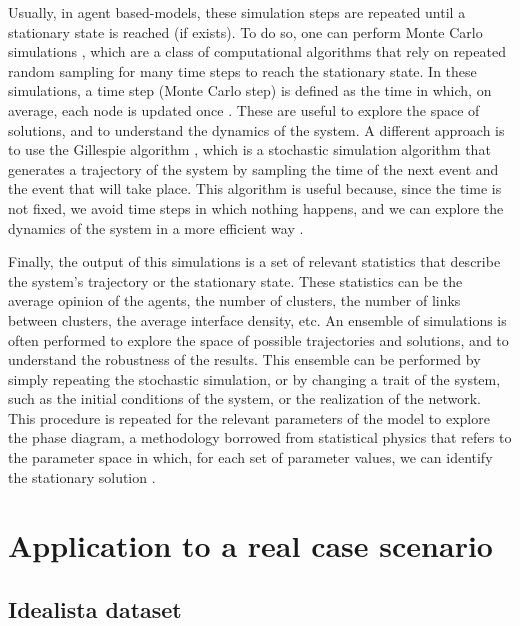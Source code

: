 Usually, in agent based-models, these simulation steps are repeated until a stationary state is reached (if exists). To do so, one can perform Monte Carlo simulations \cite{metropolis-1949}, which are a class of computational algorithms that rely on repeated random sampling for many time steps to reach the stationary state. In these simulations, a time step (Monte Carlo step) is defined as the time in which, on average, each node is updated once \cite{newman-1999, landau-2014}. These are useful to explore the space of solutions, and to understand the dynamics of the system. A different approach is to use the Gillespie algorithm \cite{gillespie-1977}, which is a stochastic simulation algorithm that generates a trajectory of the system by sampling the time of the next event and the event that will take place. This algorithm is useful because, since the time is not fixed, we avoid time steps in which nothing happens, and we can explore the dynamics of the system in a more efficient way \cite{gibson-2000}.

Finally, the output of this simulations is a set of relevant statistics that describe the system's trajectory or the stationary state. These statistics can be the average opinion of the agents, the number of clusters, the number of links between clusters, the average interface density, etc. An ensemble of simulations is often performed to explore the space of possible trajectories and solutions, and to understand the robustness of the results. This ensemble can be performed by simply repeating the stochastic simulation, or by changing a trait of the system, such as the initial conditions of the system, or the realization of the network. This procedure is repeated for the relevant parameters of the model to explore the phase diagram, a methodology borrowed from statistical physics that refers to the parameter space in which, for each set of parameter values, we can identify the stationary solution \cite{goldenfeld-1992}.

\section{\label{sec:Datasets} Application to a real case scenario}

\subsection{\label{subsec:Idealista dataset} Idealista dataset}

